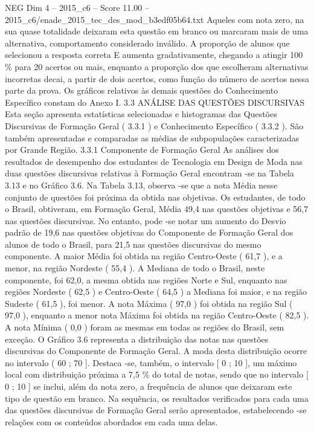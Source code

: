 \begin{textsample}{NEG Dim 4 – 2015\_c6 – Score 11.00 – 2015\_c6/enade\_2015\_tec\_des\_mod\_b3edf05b64.txt}
Aqueles com nota zero, na sua quase totalidade deixaram esta questão em branco ou marcaram mais de uma alternativa, comportamento considerado inválido.
A proporção de alunos que selecionou a resposta correta E aumenta gradativamente, chegando a atingir 100 \% para 20 acertos ou mais, enquanto a proporção dos que escolheram alternativas incorretas decai, a partir de dois acertos, como função do número de acertos nessa parte da prova.
Os gráficos relativos às demais questões do Conhecimento Específico constam do Anexo I. 3.3 ANÁLISE DAS QUESTÕES DISCURSIVAS Esta seção apresenta estatísticas selecionadas e histogramas das Questões Discursivas de Formação Geral ( 3.3.1 ) e Conhecimento Específico ( 3.3.2 ).
São também apresentadas e comparadas as médias de subpopulações caracterizadas por Grande Região. 3.3.1 Componente de Formação Geral As análises dos resultados de desempenho dos estudantes de Tecnologia em Design de Moda nas duas questões discursivas relativas à Formação Geral encontram -se na Tabela 3.13 e no Gráfico 3.6.
Na Tabela 3.13, observa -se que a nota Média nesse conjunto de questões foi próxima da obtida nas objetivas.
Os estudantes, de todo o Brasil, obtiveram, em Formação Geral, Média 49,4 nas questões objetivas e 56,7 nas questões discursivas.
No entanto, pode -se notar um aumento do Desvio padrão de 19,6 nas questões objetivas do Componente de Formação Geral dos alunos de todo o Brasil, para 21,5 nas questões discursivas do mesmo componente.
A maior Média foi obtida na região Centro-Oeste ( 61,7 ), e a menor, na região Nordeste ( 55,4 ).
A Mediana de todo o Brasil, neste componente, foi 62,0, a mesma obtida nas regiões Norte e Sul, enquanto nas regiões Nordeste ( 62,5 ) e Centro-Oeste ( 64,5 ) a Mediana foi maior, e na região Sudeste ( 61,5 ), foi menor.
A nota Máxima ( 97,0 ) foi obtida na região Sul ( 97,0 ), enquanto a menor nota Máxima foi obtida na região Centro-Oeste ( 82,5 ).
A nota Mínima ( 0,0 ) foram as mesmas em todas as regiões do Brasil, sem exceção.
O Gráfico 3.6 representa a distribuição das notas nas questões discursivas do Componente de Formação Geral.
A moda desta distribuição ocorre no intervalo ( 60 ; 70 ].
Destaca -se, também, o intervalo [ 0 ; 10 ], um máximo local com distribuição próxima a 7,5 \% do total de notas, sendo que no intervalo [ 0 ; 10 ] se inclui, além da nota zero, a frequência de alunos que deixaram este tipo de questão em branco.
Na sequência, os resultados verificados para cada uma das questões discursivas de Formação Geral serão apresentados, estabelecendo -se relações com os conteúdos abordados em cada uma delas.

\end{textsample}
